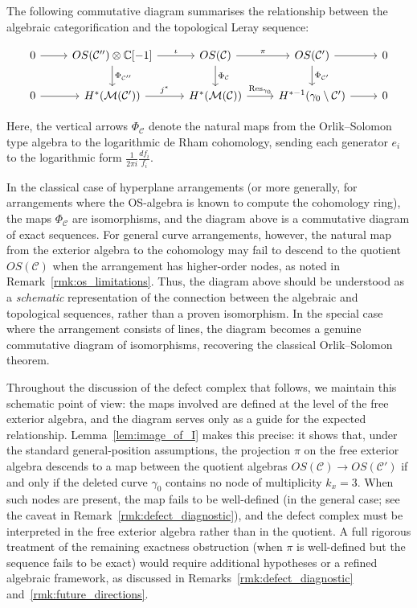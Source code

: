 \documentclass[article,11pt]{amsart} \numberwithin{equation}{section}
\numberwithin{equation}{section}
\begin{document}
{The following commutative diagram summarises the relationship between 
the algebraic categorification and the topological Leray sequence:

\[
\begin{tikzcd}
	0 \arrow[r] & 
	OS(\mathcal C'') \otimes \mathbb{C}[-1] \arrow[r, "\iota"] \arrow[d, "\Phi_{\mathcal C''}"] & 
	OS(\mathcal C) \arrow[r, "\pi"] \arrow[d, "\Phi_{\mathcal C}"] & 
	OS(\mathcal C') \arrow[r] \arrow[d, "\Phi_{\mathcal C'}"] & 0 \\
	0 \arrow[r] & 
	H^*(\mathcal M(\mathcal C')) \arrow[r, "j^*"] & 
	H^*(\mathcal M(\mathcal C)) \arrow[r, "\operatorname{Res}_{\gamma_0}"] & 
	H^{*-1}(\gamma_0 \setminus \mathcal C') \arrow[r] & 0
\end{tikzcd}
\]

Here, the vertical arrows $\Phi_{\mathcal C}$ denote the natural maps 
from the Orlik–Solomon type algebra to the logarithmic de Rham cohomology, 
sending each generator $e_i$ to the logarithmic form 
$\frac{1}{2\pi i}\frac{df_i}{f_i}$.

\begin{rk}
	\label{rmk:limitations_diagram}
	In the classical case of hyperplane arrangements (or more generally, 
	for arrangements where the OS-algebra is known to compute the 
	cohomology ring), the maps $\Phi_{\mathcal C}$ are isomorphisms, 
	and the diagram above is a commutative diagram of exact sequences. 
	For general curve arrangements, however, the natural map from the 
	exterior algebra to the cohomology may fail to descend to the quotient
	$OS(\mathcal C)$ when the arrangement has higher-order nodes, as noted
	in Remark~\ref{rmk:os_limitations}. Thus, the diagram above should 
	be understood as a \emph{schematic} representation of the connection 
	between the algebraic and topological sequences, rather than a proven 
	isomorphism. In the special case where the arrangement consists of 
	lines, the diagram becomes a genuine commutative diagram of 
	isomorphisms, recovering the classical Orlik--Solomon theorem.
	
	Throughout the discussion of the defect complex that follows, we maintain
	this schematic point of view: the maps involved are defined at the
	level of the free exterior algebra, and the diagram serves only as
	a guide for the expected relationship. Lemma~\ref{lem:image_of_I}
	makes this precise: it shows that, under the standard general-position
	assumptions, the projection $\pi$ on the free exterior algebra descends
	to a map between the quotient algebras $OS(\mathcal C)\longrightarrow OS(\mathcal C')$
	if and only if the deleted curve $\gamma_0$ contains no node of
	multiplicity $k_x=3$. When such nodes are present, the map fails to
	be well-defined (in the general case; see the caveat in
	Remark~\ref{rmk:defect_diagnostic}), and the defect complex must be
	interpreted in the free exterior algebra rather than in the quotient.
	A full rigorous treatment of the remaining exactness obstruction
	(when $\pi$ is well-defined but the sequence fails to be exact)
	would require additional hypotheses or a refined algebraic framework,
	as discussed in Remarks~\ref{rmk:defect_diagnostic}
	and~\ref{rmk:future_directions}.
\end{rk}

}
\end{document}
